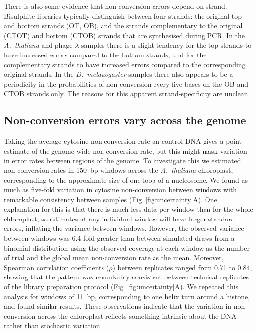\documentclass[10pt,draft,letterpaper]{article}
\begin{document}
There is also some evidence that non-conversion errors depend on strand.
Bisulphite libraries typically distinguish between four strands: the original top and bottom strands (OT, OB), and the strands complementary to the original (CTOT) and bottom (CTOB) strands that are synthesised during PCR.
In the \emph{A.~thaliana} and phage $\lambda$ samples there is a slight tendency for the top strands to have increased errors compared to the bottom strands, and for the complementary strands to have increased errors compared to the corresponding original strands.
In the \emph{D.~melanogaster} samples there also appears to be a periodicity in the probabilities of non-conversion every five bases on the OB and CTOB strands only.
The reasons for this apparent strand-specificity are unclear.

\subsection*{Non-conversion errors vary across the genome}

Taking the average cytosine non-conversion rate on control DNA gives a point estimate of the genome-wide non-conversion rate, but this might mask variation in error rates between regions of the genome.
To investigate this we estimated non-conversion rates in 150~bp windows across the \emph{A.~thaliana} chloroplast, corresponding to the approximate size of one loop of a nucleosome.
We found as much as five-fold variation in cytosine non-conversion between windows with remarkable consistency between samples (Fig~\ref{fig:uncertainty}A).
One explanation for this is that there is much less data per window than for the whole chloroplast, so estimates at any individual window will have larger standard errors, inflating the variance between windows.
However, the observed variance between windows was 6.4-fold greater than between simulated draws from a binomial distribution using the observed coverage at each window as the number of trial and the global mean non-conversion rate as the mean.
Moreover, Spearman correlation coefficients ($\rho$) between replicates ranged from 0.71 to 0.84, showing that the pattern was remarkably consistent between technical replicates of the library preparation protocol (Fig~\ref{fig:uncertainty}A).
We repeated this analysis for windows of 11~bp, corresponding to one helix turn around a histone, and found similar results.
These observations indicate that the variation in non-conversion across the chloroplast reflects something intrinsic about the DNA rather than stochastic variation.
\end{document}

